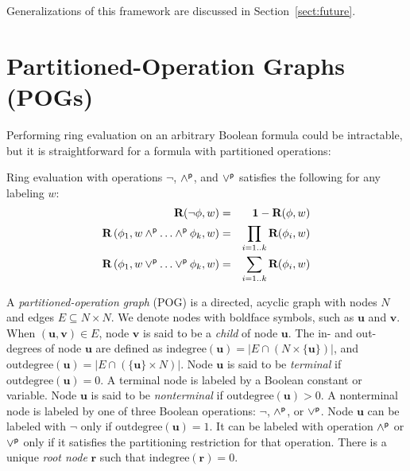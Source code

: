 \documentclass[letterpaper,USenglish,cleveref, autoref, thm-restate]{lipics-v2021}
\newcommand{\pand}{\mathbin{\land^{\sf p}}}
\newcommand{\por}{\mathbin{\lor^{\sf p}}}
\DeclareMathOperator*{\Pand}{\bigwedge^{\sf p}}
\DeclareMathOperator*{\Por}{\bigvee^{\sf p}}
\newcommand{\boolnot}{\neg}
\newcommand{\rep}{\textbf{R}}
\newcommand{\mulident}{\textbf{1}}
\newcommand{\indegree}{\textrm{indegree}}
\newcommand{\outdegree}{\textrm{outdegree}}
\newcommand{\makenode}[1]{\mathbf{#1}}
\newcommand{\nodeu}{\makenode{u}}
\newcommand{\nodev}{\makenode{v}}
\newcommand{\noder}{\makenode{r}}
\begin{document}
Generalizations of this framework are discussed in Section~\ref{sect:future}.

\section{Partitioned-Operation Graphs (POGs)}

Performing ring evaluation on an arbitrary Boolean formula could be intractable, but it is straightforward for a formula with partitioned operations:
\begin{proposition}
Ring evaluation with operations $\boolnot$, $\pand$, and $\por$ satisfies the following for any labeling $w$:
\begin{eqnarray}
\rep(\boolnot \phi, w) &=& \mulident - \rep(\phi, w) \label{eqn:ring:negation} \\
\rep\left(\phi_1, w \pand \dots \pand \phi_k, w \right) &=& \prod_{i=1..k} \rep(\phi_i, w) \label{eqn:ring:product} \\
\rep\left(\phi_1, w \por \dots \por \phi_k, w \right) &=& \sum_{i=1..k} \rep(\phi_i, w) \label{eqn:ring:sum}
\end{eqnarray}
\end{proposition}

A {\em partitioned-operation graph} (POG) is a directed, acyclic graph
with nodes $N$ and edges $E \subseteq N \times N$.  We denote nodes with boldface symbols, such as $\nodeu$ and $\nodev$.
When $(\nodeu,\nodev) \in E$,
node $\nodev$ is said to be a {\em child} of node $\nodeu$.
The in- and out-degrees of node $\nodeu$ are defined as $\indegree(\nodeu) = | E \cap (N \times \{\nodeu\}) |$, and
$\outdegree(\nodeu) = | E \cap (\{\nodeu\} \times N) |$.
Node $\nodeu$ is said to be {\em terminal} if $\outdegree(\nodeu) = 0$.  A terminal node is labeled by a Boolean constant or variable.
Node $\nodeu$ is said to be {\em nonterminal} if $\outdegree(\nodeu) > 0$.  A nonterminal node is labeled by one of three Boolean operations:
$\boolnot$, $\pand$, or $\por$.  Node $\nodeu$ can be labeled with $\boolnot$ only if $\outdegree(\nodeu) = 1$.
It can be labeled with operation $\pand$ or $\por$ only if it satisfies the partitioning restriction for that operation.
There is a unique {\em root node} $\noder$ such that $\indegree(\noder) = 0$.
\end{document}
